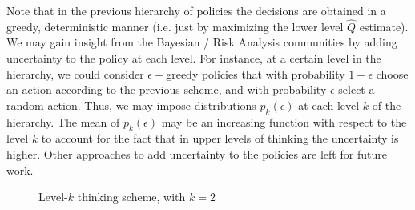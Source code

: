 \documentclass[letterpaper]{article} %
\begin{document}
Note that in the previous hierarchy of policies the decisions are obtained in a greedy, deterministic manner (i.e. just by maximizing the lower level $\hat{Q}$ estimate). We may gain insight from the Bayesian / Risk Analysis communities by adding uncertainty to the policy at each level. For instance, at a certain level in the hierarchy, we could consider $\epsilon-$greedy policies that with probability $1-\epsilon$ choose an action according to the previous scheme, and with probability $\epsilon$ select a random action. Thus, we may impose distributions $p_k(\epsilon)$ at each level $k$ of the hierarchy. The mean of $p_k(\epsilon)$ may be an increasing function with respect to the level $k$ to account for the fact that in upper levels of thinking the uncertainty is higher. Other approaches to add uncertainty to the policies are left for future work.


\begin{figure}
\centering
{}
\caption{Level-$k$ thinking scheme, with $k=2$}\label{fig:lev2_scheme}
\end{figure}

\end{document}
